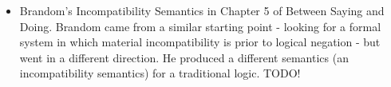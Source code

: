 \begin{itemize}
  \item Brandom's Incompatibility Semantics in Chapter 5 of Between Saying and Doing. Brandom came from a similar starting point - looking for a formal system in which material incompatibility is prior to logical negation - but went in a different direction. He produced a different semantics (an incompatibility semantics) for a traditional logic. TODO!

\end{itemize}
